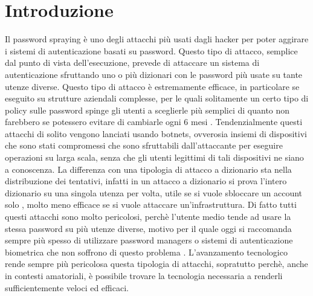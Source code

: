 \section{Introduzione}

Il password spraying è uno degli attacchi più usati dagli hacker per poter aggirare i sistemi di autenticazione basati su password. Questo tipo di attacco, semplice dal punto di vista dell'esecuzione, prevede di attaccare un sistema di autenticazione sfruttando uno o più dizionari con le password più usate su tante utenze diverse\cite{pwspray}. Questo tipo di attacco è estremamente efficace, in particolare se eseguito su strutture aziendali complesse, per le quali solitamente un certo tipo di policy sulle password spinge gli utenti a sceglierle più semplici di quanto non farebbero se potessero evitare di cambiarle ogni 6 mesi .  Tendenzialmente questi attacchi di solito vengono lanciati usando botnets, ovverosia insiemi di dispositivi che sono stati compromessi che sono sfruttabili dall'attaccante per eseguire operazioni su larga scala, senza che gli utenti legittimi di tali dispositivi ne siano a conoscenza. La differenza con una tipologia di attacco a dizionario sta nella distribuzione dei tentativi, infatti in un attacco a dizionario si prova l'intero dizionario su una singola utenza per volta, utile se si vuole sbloccare un account solo , molto meno efficace se si vuole attaccare un'infrastruttura. Di fatto tutti questi attacchi sono molto pericolosi, perchè l'utente medio tende ad usare la stessa password su più utenze diverse, motivo per il quale oggi si raccomanda sempre più spesso di utilizzare password managers o sistemi di autenticazione biometrica che non soffrono di questo problema \cite{nist80063b}. L'avanzamento tecnologico rende sempre più pericolosa questa tipologia di attacchi, sopratutto perchè, anche in contesti amatoriali, è possibile trovare la tecnologia necessaria a renderli sufficientemente veloci ed efficaci.
